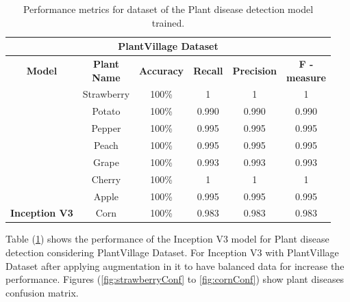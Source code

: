 \begin{table}[H]
  \setlength\arrayrulewidth{0.5pt}
  \renewcommand{\arraystretch}{1.5}
  \begin{tabularx}{\textwidth}{|X|c|c|c|c|c|}
      \hline
      \multicolumn{6}{|c|}{\textbf{PlantVillage Dataset}} \\ \hline
      \multicolumn{1}{|c|}{\textbf{Model}} & \makecell{\textbf{Plant} \\[-4pt] \textbf{Name}} & \textbf{Accuracy} & \textbf{Recall} & \textbf{Precision} & \makecell{\textbf{F -} \\[-4pt] \textbf{measure}} \\ \hline
       & Strawberry & 100\%  & 1 & 1 & 1 \\ \cline{2-6}
       & Potato & 100\%  & 0.990 & 0.990 & 0.990 \\ \cline{2-6}
       & Pepper & 100\%  & 0.995 & 0.995 & 0.995 \\ \cline{2-6}
       & Peach & 100\%  & 0.995 & 0.995 & 0.995 \\ \cline{2-6}
       & Grape & 100\%  & 0.993 & 0.993 & 0.993 \\ \cline{2-6}
       & Cherry & 100\%  & 1 & 1 & 1 \\ \cline{2-6}
       & Apple & 100\%  & 0.995 & 0.995 & 0.995 \\ \cline{2-6}
      \multirow{-8}{*}{\textbf{Inception V3}} & Corn & 100\%  & 0.983 & 0.983 & 0.983 \\ \hline
  \end{tabularx}
  \caption{Performance metrics for dataset of the Plant disease detection model trained.}
  \label{tab:preform2}
\end{table}

Table (\ref{tab:preform2}) shows the performance of the Inception V3 model for Plant 
disease detection considering PlantVillage Dataset. For Inception V3 with PlantVillage 
Dataset after applying augmentation in it to have balanced data for increase the performance. 
Figures (\ref{fig:strawberryConf} to \ref{fig:cornConf}) show plant diseases confusion matrix.

